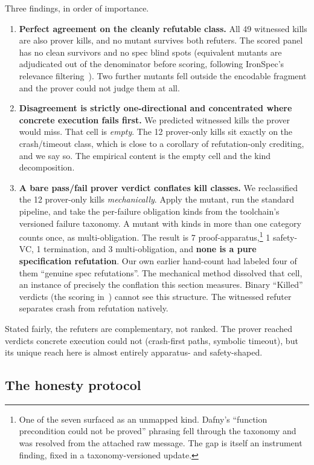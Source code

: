 \documentclass{article}
\begin{document}
Three findings, in order of importance.
\begin{enumerate}
  \item \textbf{Perfect agreement on the cleanly refutable class.} All 49
  witnessed kills are also prover kills, and no mutant survives both
  refuters. The scored panel has no clean survivors and no spec blind
  spots (equivalent mutants are adjudicated out of the denominator before
  scoring, following IronSpec's relevance filtering~\cite{ironspec}). Two
  further mutants fell outside the encodable fragment and the prover could
  not judge them at all.
  \item \textbf{Disagreement is strictly one-directional and concentrated
  where concrete execution fails first.} We predicted witnessed kills the
  prover would miss. That cell is \emph{empty}. The 12 prover-only kills
  sit exactly on the crash/timeout class, which is close to a corollary of
  refutation-only crediting, and we say so. The empirical content is the
  empty cell and the kind decomposition.
  \item \textbf{A bare pass/fail prover verdict conflates kill classes.}
  We reclassified the 12 prover-only kills \emph{mechanically}. Apply the
  mutant, run the standard pipeline, and take the per-failure obligation
  kinds from the toolchain's versioned failure taxonomy. A mutant with
  kinds in more than one category counts once, as multi-obligation. The
  result is 7 proof-apparatus,\footnote{One of the seven surfaced as an
  unmapped kind. Dafny's ``function precondition could not be proved''
  phrasing fell through the taxonomy and was resolved from the attached
  raw message. The gap is itself an instrument finding, fixed in a
  taxonomy-versioned update.} 1 safety-VC, 1 termination, and 3
  multi-obligation, and \textbf{none is a pure specification refutation}.
  Our own earlier hand-count had labeled four of them ``genuine spec
  refutations''. The mechanical method dissolved that cell, an instance of
  precisely the conflation this section measures. Binary ``Killed''
  verdicts (the scoring in~\cite{mutdafny}) cannot see this structure. The
  witnessed refuter separates crash from refutation natively.
\end{enumerate}

Stated fairly, the refuters are complementary, not ranked. The prover
reached verdicts concrete execution could not (crash-first paths, symbolic
timeout), but its unique reach here is almost entirely apparatus- and
safety-shaped.

\subsection{The honesty protocol}
\label{sec:honesty}
\end{document}
